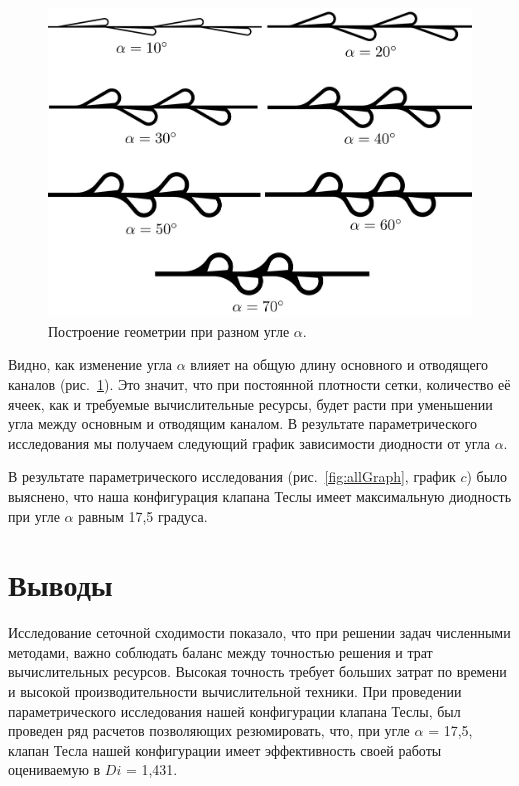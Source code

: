 \documentclass[10pt,a4paper]{book}
\begin{document}
    \begin{figure}[H]
        \centering
        \includegraphics[width = 1\linewidth]{allAngle1}
        \caption{Построение геометрии при разном угле $\alpha$.}
        \label{fig:allAngle}
    \end{figure}  
          
    Видно, как изменение угла $\alpha$ влияет на общую длину основного и отводящего каналов (рис.~\ref{fig:allAngle}). Это значит, что при постоянной плотности сетки, количество её ячеек, как и требуемые вычислительные ресурсы, будет расти при уменьшении угла между основным и отводящим каналом. В результате параметрического исследования мы получаем следующий график зависимости диодности от угла $ \alpha $.
  
    В результате параметрического исследования (рис.~\ref{fig:allGraph}, график $c$) было выяснено, что наша конфигурация клапана Теслы имеет максимальную диодность при угле $ \alpha $ равным 17,5 градуса. 
    
    \section{Выводы}
    
    Исследование сеточной сходимости показало, что при решении задач численными методами, важно соблюдать баланс между точностью решения и трат вычислительных ресурсов. Высокая точность требует больших затрат по времени и высокой производительности вычислительной техники. При проведении параметрического исследования нашей конфигурации клапана Теслы, был проведен ряд расчетов позволяющих резюмировать, что, при угле $\alpha$  = 17,5\textdegree, клапан Тесла нашей конфигурации имеет эффективность своей работы оцениваемую в $Di$ = 1,431.
    
\end{document}
